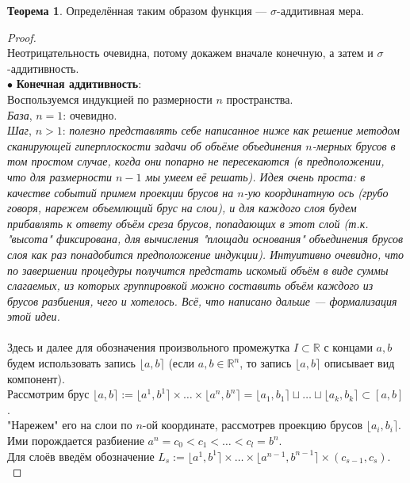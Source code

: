 \documentclass[11pt,a4paper]{report}
\def\Real{\mathbb{R}}
\theoremstyle{definition}
\theoremstyle{definition}
\newtheorem{theorem}{Теорема}[section]
\theoremstyle{definition}
\begin{document}
	\begin{theorem}
		Определённая таким образом функция — $ \sigma $-аддитивная мера.
	\end{theorem}
	\begin{proof}$  $\\
		Неотрицательность очевидна, потому докажем вначале конечную, а затем и $ \sigma $-аддитивность.\\
		$ \bullet $ \textbf{Конечная аддитивность}:\\
		Воспользуемся индукцией по размерности $ n $ пространства.\\
		\textit{База}, $ n = 1 $: очевидно.\\
		\textit{Шаг}, $ n > 1 $: \textit{полезно представлять себе написанное ниже как решение методом сканирующей гиперплоскости задачи об объёме объединения $ n $-мерных брусов в том простом случае, когда они попарно не пересекаются (в предположении, что для размерности $ n-1 $ мы умеем её решать). Идея очень проста: в качестве событий примем проекции брусов на $ n $-ую координатную ось (грубо говоря, нарежем объемлющий брус на слои), и для каждого слоя будем прибавлять к ответу объём среза брусов, попадающих в этот слой (т.к. "высота" фиксирована, для вычисления "площади основания" объединения брусов слоя как раз понадобится предположение индукции). Интуитивно очевидно, что по завершении процедуры получится предстать искомый объём в виде суммы слагаемых, из которых группировкой можно составить объём каждого из брусов разбиения, чего и хотелось. Всё, что написано дальше — формализация этой идеи.}\\\\
		Здесь и далее для обозначения произвольного промежутка $ I \subset \mathbb{R} $ с концами $ a, b $ будем использовать запись $ \lfloor a, b \rceil $ (если $ a, b \in \Real^{n} $, то запись $ \lfloor a, b \rceil $ описывает вид компонент).\\
		Рассмотрим брус $ \lfloor a, b \rceil := \lfloor a^{1}, b^{1} \rceil \times \dots \times \lfloor a^{n}, b^{n} \rceil = \lfloor a_{1}, b_{1} \rceil \sqcup \dots \sqcup \lfloor a_{k}, b_{k} \rceil \subset [a, b] $.\\
		"Нарежем" его на слои по $ n $-ой координате, рассмотрев проекцию брусов $ \lfloor a_{i}, b_{i} \rceil $.\\
		Ими порождается разбиение $ a^{n} = c_{0} < c_{1} < \dots < c_{l} = b^{n} $.\\ 
		Для слоёв введём обозначение $ L_{s} := \lfloor a^{1}, b^{1} \rceil \times \dots \times \lfloor a^{n-1}, b^{n-1} \rceil \times (c_{s-1}, c_{s}) $.\\

\end{proof}
\end{document}
